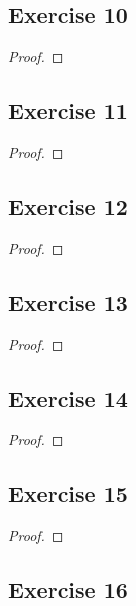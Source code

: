 \documentclass[14pt]{extarticle}
\begin{document}
\subsection{Exercise 10}

\begin{proof}

\end{proof}

\subsection{Exercise 11}

\begin{proof}

\end{proof}

\subsection{Exercise 12}

\begin{proof}

\end{proof}

\subsection{Exercise 13}

\begin{proof}

\end{proof}

\subsection{Exercise 14}

\begin{proof}

\end{proof}

\subsection{Exercise 15}

\begin{proof}

\end{proof}

\subsection{Exercise 16}
\end{document}
